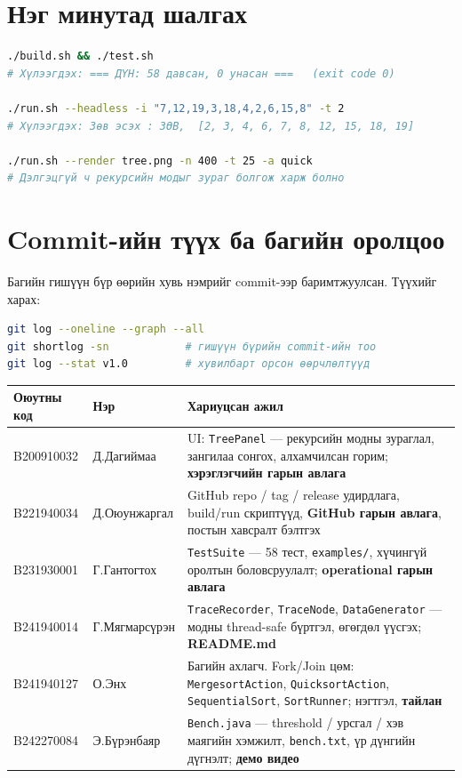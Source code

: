 \documentclass[11pt,a4paper]{article}
\begin{document}
\section{Нэг минутад шалгах}

\begin{lstlisting}[language=bash]
./build.sh && ./test.sh
# Хүлээгдэх: === ДҮН: 58 давсан, 0 унасан ===   (exit code 0)

./run.sh --headless -i "7,12,19,3,18,4,2,6,15,8" -t 2
# Хүлээгдэх: Зөв эсэх : ЗӨВ,  [2, 3, 4, 6, 7, 8, 12, 15, 18, 19]

./run.sh --render tree.png -n 400 -t 25 -a quick
# Дэлгэцгүй ч рекурсийн модыг зураг болгож харж болно
\end{lstlisting}

\section{Commit-ийн түүх ба багийн оролцоо}

Багийн гишүүн бүр өөрийн хувь нэмрийг commit-ээр баримтжуулсан.
Түүхийг харах:

\begin{lstlisting}[language=bash]
git log --oneline --graph --all
git shortlog -sn            # гишүүн бүрийн commit-ийн тоо
git log --stat v1.0         # хувилбарт орсон өөрчлөлтүүд
\end{lstlisting}

\begin{center}
\small
\begin{tabular}{llL{7.6cm}}
\toprule
Оюутны код & Нэр & Хариуцсан ажил \\
\midrule
B200910032 & Д.Дагиймаа & UI: \texttt{TreePanel} --- рекурсийн модны зураглал, зангилаа сонгох, алхамчилсан горим; \textbf{хэрэглэгчийн гарын авлага} \\
B221940034 & Д.Оюунжаргал & GitHub repo / tag / release удирдлага, build/run скриптүүд, \textbf{GitHub гарын авлага}, постын хавсралт бэлтгэх \\
B231930001 & Г.Гантогтох & \texttt{TestSuite} --- 58 тест, \texttt{examples/}, хүчингүй оролтын боловсруулалт; \textbf{operational гарын авлага} \\
B241940014 & Г.Мягмарсүрэн & \texttt{TraceRecorder}, \texttt{TraceNode}, \texttt{DataGenerator} --- модны thread-safe бүртгэл, өгөгдөл үүсгэх; \textbf{README.md} \\
B241940127 & О.Энх & Багийн ахлагч. Fork/Join цөм: \texttt{MergesortAction}, \texttt{QuicksortAction}, \texttt{SequentialSort}, \texttt{SortRunner}; нэгтгэл, \textbf{тайлан} \\
B242270084 & Э.Бүрэнбаяр & \texttt{Bench.java} --- threshold / урсгал / хэв маягийн хэмжилт, \texttt{bench.txt}, үр дүнгийн дүгнэлт; \textbf{демо видео} \\
\bottomrule
\end{tabular}
\end{center}
\end{document}
